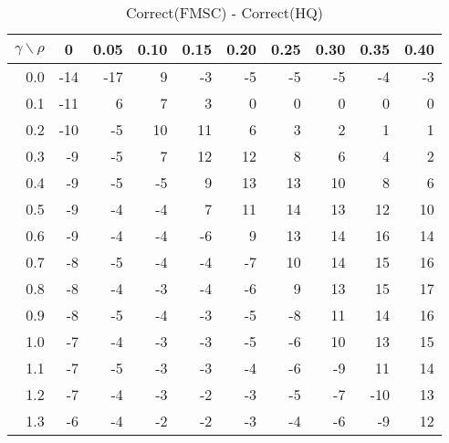 \documentclass[12pt]{article}
\begin{document}
%

\begin{table}[!tbp]
\caption{Correct(FMSC) - Correct(HQ)}
 \begin{center}
 \begin{tabular}{r|rrrrrrrrr}\hline\hline
\multicolumn{1}{c|}{$\gamma\backslash\rho$}&\multicolumn{1}{c}{0}&\multicolumn{1}{c}{0.05}&\multicolumn{1}{c}{0.10}&\multicolumn{1}{c}{0.15}&\multicolumn{1}{c}{0.20}&\multicolumn{1}{c}{0.25}&\multicolumn{1}{c}{0.30}&\multicolumn{1}{c}{0.35}&\multicolumn{1}{c}{0.40}\tabularnewline
\hline


0.0&-14&-17& 9&-3&-5&-5&-5& -4&-3\tabularnewline
0.1&-11&  6& 7& 3& 0& 0& 0&  0& 0\tabularnewline
0.2&-10& -5&10&11& 6& 3& 2&  1& 1\tabularnewline
0.3& -9& -5& 7&12&12& 8& 6&  4& 2\tabularnewline
0.4& -9& -5&-5& 9&13&13&10&  8& 6\tabularnewline
0.5& -9& -4&-4& 7&11&14&13& 12&10\tabularnewline
0.6& -9& -4&-4&-6& 9&13&14& 16&14\tabularnewline
0.7& -8& -5&-4&-4&-7&10&14& 15&16\tabularnewline
0.8& -8& -4&-3&-4&-6& 9&13& 15&17\tabularnewline
0.9& -8& -5&-4&-3&-5&-8&11& 14&16\tabularnewline
1.0& -7& -4&-3&-3&-5&-6&10& 13&15\tabularnewline
1.1& -7& -5&-3&-3&-4&-6&-9& 11&14\tabularnewline
1.2& -7& -4&-3&-2&-3&-5&-7&-10&13\tabularnewline
1.3& -6& -4&-2&-2&-3&-4&-6& -9&12\tabularnewline
\hline
\end{tabular}

\end{center}

\end{table}

%
\end{document}

